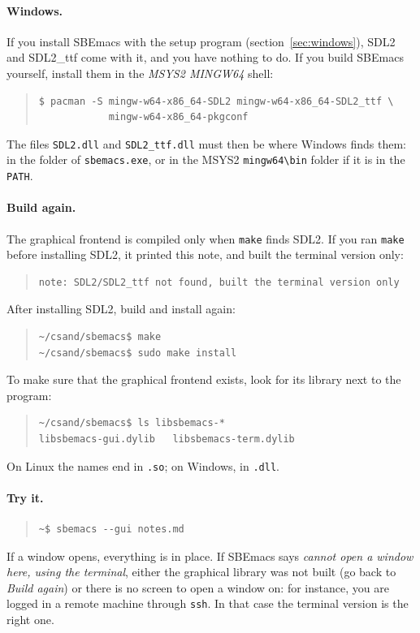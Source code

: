 \documentclass[a4paper,12pt,openany]{book}
\begin{document}
\paragraph{Windows.} If you install SBEmacs with the setup program
(section~\ref{sec:windows}), SDL2 and SDL2\_ttf come with it, and you
have nothing to do. If you build SBEmacs yourself, install them in the {\em MSYS2
MINGW64} shell:
\begin{quote}
\begin{verbatim}
$ pacman -S mingw-w64-x86_64-SDL2 mingw-w64-x86_64-SDL2_ttf \
            mingw-w64-x86_64-pkgconf
\end{verbatim}
\end{quote}
The files \verb|SDL2.dll| and \verb|SDL2_ttf.dll| must then be where
Windows finds them: in the folder of \verb|sbemacs.exe|, or in the MSYS2
\verb|mingw64\bin| folder if it is in the \verb|PATH|.

\paragraph{Build again.} The graphical frontend is compiled only when
\verb|make| finds SDL2. If you ran \verb|make| before installing SDL2, it
printed this note, and built the terminal version only:
\begin{quote}
\begin{verbatim}
note: SDL2/SDL2_ttf not found, built the terminal version only
\end{verbatim}
\end{quote}
After installing SDL2, build and install again:
\begin{quote}
\begin{verbatim}
~/csand/sbemacs$ make
~/csand/sbemacs$ sudo make install
\end{verbatim}
\end{quote}
To make sure that the graphical frontend exists, look for its library next
to the program:
\begin{quote}
\begin{verbatim}
~/csand/sbemacs$ ls libsbemacs-*
libsbemacs-gui.dylib   libsbemacs-term.dylib
\end{verbatim}
\end{quote}
On Linux the names end in \verb|.so|; on Windows, in \verb|.dll|.

\paragraph{Try it.}
\begin{quote}
\begin{verbatim}
~$ sbemacs --gui notes.md
\end{verbatim}
\end{quote}
If a window opens, everything is in place. If SBEmacs says
{\em cannot open a window here, using the terminal}, either the graphical
library was not built (go back to {\em Build again}) or there is no screen
to open a window on: for instance, you are logged in a remote machine
through \verb|ssh|. In that case the terminal version is the right one.
\end{document}
